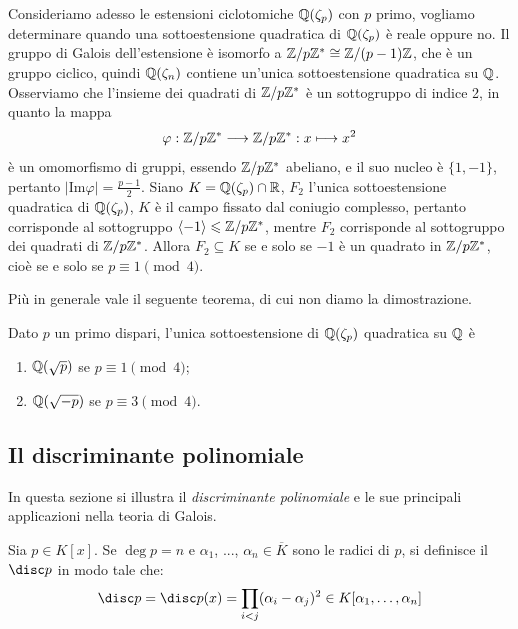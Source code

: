 \documentclass[11pt]{scrartcl}
\begin{document}
	Consideriamo adesso le estensioni ciclotomiche $\mathbb Q(\zeta_p)$ con $p$ primo,
	vogliamo determinare quando una sottoestensione quadratica di $\mathbb Q(\zeta_p)$
	è reale oppure no. Il gruppo di Galois dell'estensione è isomorfo a ${\mathbb Z}/p{\mathbb Z}^* \cong 
	\mathbb{Z}/{(p -1)}\mathbb{Z}$, che è un gruppo ciclico, quindi $\mathbb Q(\zeta_n)$ contiene un'unica 
	sottoestensione quadratica su $\mathbb Q$. Osserviamo che l'insieme dei quadrati 
	di ${\mathbb Z}/p{\mathbb Z}^*$ è un sottogruppo di indice 2, in quanto la mappa 
	\[
	\varphi: {\mathbb Z}/p{\mathbb Z}^* \longrightarrow {\mathbb Z}/p{\mathbb Z}^*: x \longmapsto x^2
	\]
	è un omomorfismo di gruppi, essendo ${\mathbb Z}/p{\mathbb Z}^*$ abeliano, e il suo nucleo è $\{1, -1\}$,
	pertanto $|\mathrm{Im}\varphi| = \displaystyle\frac{p - 1}{2}$. Siano $K = \mathbb Q(\zeta_p)\cap \mathbb R$,
	$F_2$ l'unica sottoestensione quadratica di $\mathbb Q(\zeta_p)$, $K$ è il campo 
	fissato dal coniugio complesso, pertanto corrisponde al sottogruppo
	$\langle -1\rangle \leqslant {\mathbb Z}/p{\mathbb Z}^*$, mentre $F_2$ corrisponde al sottogruppo
	dei quadrati di ${\mathbb Z}/p{\mathbb Z}^*$. Allora $F_2 \subseteq K$ se e solo se $-1$ è un 
	quadrato in ${\mathbb Z}/p{\mathbb Z}^*$, cioè se e solo se $p \equiv 1 \pmod 4$.
	
	Più in generale vale il seguente teorema, di cui non diamo la dimostrazione.
	
	\begin{theorem}
		Dato $p$ un primo dispari, l'unica sottoestensione di $\mathbb Q(\zeta_p)$ 
		quadratica su $\mathbb Q$ è
		\begin{enumerate}[(1)]
			\item $\mathbb Q(\sqrt p)$ se $p \equiv 1 \pmod 4$;
			\item $\mathbb Q(\sqrt{-p})$ se $p \equiv 3 \pmod 4$.
		\end{enumerate}
	\end{theorem}   
	
	\newpage
	\subsection{Il discriminante polinomiale}
	In questa sezione si illustra il \textit{discriminante polinomiale} e
	le sue principali applicazioni nella teoria di Galois.
	
	\begin{definition}
		Sia $p \in K[x]$. Se $\deg p = n$ e $\alpha_1$, ..., $\alpha_n \in \overline{K}$ sono le radici
		di $p$, si definisce il  $\disc p$ in modo
		tale che:
		\[ \disc p = \disc p(x) = \prod_{i < j} (\alpha_i - \alpha_j)^2 \in K[\alpha_1, \ldots, \alpha_n] \]
	\end{definition}
	
\end{document}
